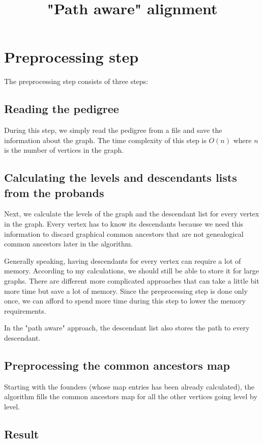 \documentclass[14pt]{extarticle}
\begin{document}
	
\title{"Path aware" alignment}
\date{}
		
\section{Preprocessing step}

The preprocessing step consists of three steps:

\subsection{Reading the pedigree}

During this step, we simply read the pedigree from a file and save the information about the graph. The time complexity of this step is $O(n)$ where $n$ is the number of vertices in the graph.

\subsection{Calculating the levels and descendants lists from the probands}

Next, we calculate the levels of the graph and the descendant list for every vertex in the graph. Every vertex has to know its descendants because we need this information to discard graphical common ancestors that are not genealogical common ancestors later in the algorithm.

Generally speaking, having descendants for every vertex can require a lot of memory. According to my calculations, we should still be able to store it for large graphs. There are different more complicated approaches that can take a little bit more time but save a lot of memory. Since the preprocessing step is done only once, we can afford to spend more time during this step to lower the memory requirements.

In the "path aware" approach, the descendant list also stores the path to every descendant.

\subsection{Preprocessing the common ancestors map}

Starting with the founders (whose map entries has been already calculated), the algorithm fills the common ancestors map for all the other vertices going level by level.

\subsection{Result}
\end{document}

